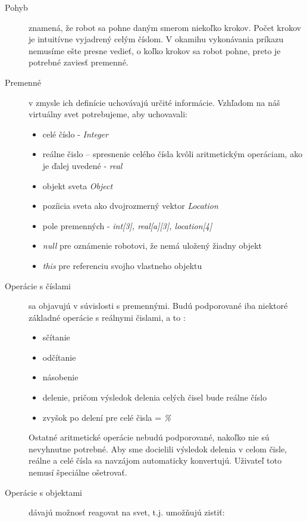 \begin{description}
\item[Pohyb] znamená, že robot sa pohne daným smerom niekoľko krokov. Počet krokov je intuitívne vyjadrený celým číslom. V okamihu vykonávania príkazu nemusíme ešte presne vedieť, o koľko krokov sa robot pohne, preto je potrebné zaviesť premenné.
\item[Premenné] v zmysle ich  definície uchovávajú určité informácie. Vzhľadom na náš virtuálny svet potrebujeme, aby uchovavali: %
\begin {itemize}
\item celé číslo - {\it Integer}
\item reálne čislo -- spresnenie celého čísla kvôli aritmetickým operáciam, ako je ďalej uvedené - {\it real}
\item objekt sveta {\it Object}
\item pozíicia sveta ako dvojrozmerný vektor {\it Location}
\item pole premenných - {\it int[3], real[a][3], location[4] } %
\item {\it null} pre oznámenie robotovi, že nemá uložený žiadny objekt
\item {\it this} pre referenciu svojho vlastneho objektu
\end{itemize}  
\item[Operácie s číslami] sa objavujú v súvislosti s premennými. Budú podporované iba niektoré základné operácie s reálnymi čislami, a to :
\begin{itemize}
\item sčítanie
\item odčítanie
\item násobenie
\item delenie, pričom výsledok delenia celých čisel bude reálne číslo
\item zvyšok po delení pre celé čisla = {\it \%}
\end{itemize}
Ostatné aritmetické operácie nebudú podporované, nakoľko nie sú nevyhnutne potrebné. Aby sme docielili výsledok delenia v celom čisle, reálne a celé čísla sa navzájom automaticky konvertujú. Uživateľ toto nemusí špeciálne ošetrovať. %
\item [Operácie s objektami] dávajú možnosť reagovat na svet,  t.j. umožňujú zistiť:

\end{description}
